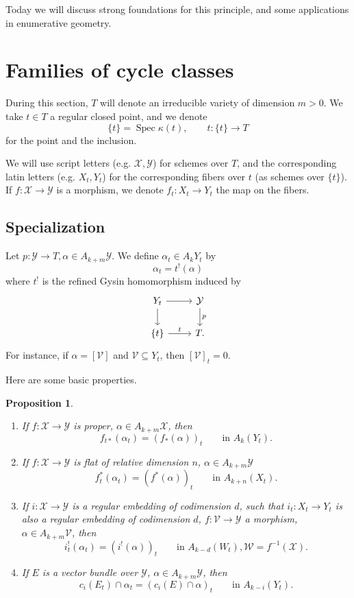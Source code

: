 \documentclass[leqno, openany]{memoir}
\newtheorem{prop}[thm]{Proposition}
\theoremstyle{definition}
\theoremstyle{remark}
\theoremstyle{plain}
\theoremstyle{definition}
\theoremstyle{remark}
\newcommand{\mc}[1]{\mathcal{#1}}
\DeclareMathOperator{\Spec}{Spec}
\begin{document}
Today we will discuss strong foundations for this principle, and some applications in enumerative geometry. 

\section{Families of cycle classes}

During this section, $T$ will denote an irreducible variety of dimension $m>0$. We take $t \in T$ a regular closed point, and we denote
\[ \{t\}=\Spec \kappa(t), \qquad t\colon \{t\} \to T \] 
for the point and the inclusion.

We will use script letters (e.g. $\mc{X}, \mc{Y}$) for schemes over $T$, and the corresponding latin letters (e.g. $X_t, Y_t$) for the corresponding fibers over $t$ (as schemes over $\{t\}$). If $f\colon \mc{X} \to \mc{Y}$ is a morphism, we denote $f_t\colon X_t \to Y_t$ the map on the fibers.

\subsection{Specialization}%
\label{sub:specialization}


Let $p\colon \mc{Y} \to T, \alpha \in A_{k+m}\mc{Y}$. We define $\alpha_t \in A_k Y_t$ by
\[ \alpha_t = t^!(\alpha) \]
where $t^{!}$ is the refined Gysin homomorphism induced by
\[ \begin{tikzcd} Y_t \arrow[r] \arrow[d] & \mc{Y} \arrow[d, "p"] \\ {\{t\}} \arrow[r, "t"] & T. \end{tikzcd} \]
For instance, if $\alpha=[\mc{V}]$ and $\mc{V} \subseteq Y_t$, then ${[\mc{V}]}_t=0$. 

Here are some basic properties.
\begin{prop}\label{prop:basicprop}
\begin{enumerate}
\item If $f\colon \mc{X} \to \mc{Y}$ is proper, $\alpha \in A_{k+m}\mc{X}$, then
\[ f_{t\ast}(\alpha_t)={ (f_\ast(\alpha)) }_t \qquad \text{in }A_k(Y_t). \]

\item If $f\colon \mc{X} \to \mc{Y}$ is flat of relative dimension $n$, $\alpha \in A_{k+m}\mc{Y}$
\[ f_t^\ast(\alpha_t)={ (f^\ast(\alpha)) }_t \qquad \text{in }A_{k+n}(X_t). \]

\item If $i\colon \mc{X} \to \mc{Y}$ is a regular embedding of codimension $d$, such that $i_t\colon X_t \to Y_t$ is also a regular embedding of codimension $d$, $f\colon \mc{V} \to \mc{Y}$ a morphism, $\alpha \in A_{k+m}\mc{V}$, then
\[ i_t^!(\alpha_t)={ (i^!(\alpha)) }_t \qquad \text{in } A_{k-d}(W_t), \mc{W}=f^{-1}(\mc{X}). \]
\end{enumerate}
\begin{enumerate} \setcounter{enumi}{3}
\item If $E$ is a vector bundle over $\mc{Y}$, $\alpha \in A_{k+m} \mc{Y}$, then 
\[ c_i(E_t) \cap \alpha_t = { (c_i(E) \cap \alpha) }_t \qquad \text{in }A_{k-i}(Y_t). \]
\end{enumerate}
\end{prop}
\end{document}
